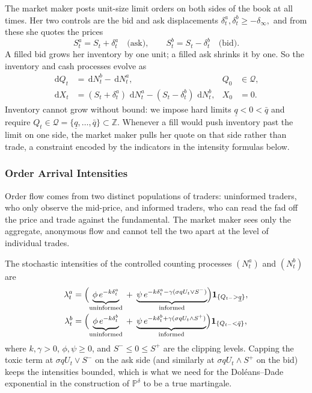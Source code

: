 \documentclass[11pt,a4paper]{article}
\theoremstyle{plain}
\theoremstyle{definition}
\newcommand{\Prob}{\mathbb{P}}
\newcommand{\dd}{\,\mathrm{d}}
\begin{document}
The market maker posts unit-size limit orders on both sides of the book at
all times. Her two controls are the bid and ask displacements
\(\delta^a_t,\delta^b_t \ge -\delta_\infty,\) and from these she quotes
the prices
\begin{equation}
\label{eq:quotes}
  S^a_t = S_t + \delta^a_t \quad\text{(ask)}, \qquad
  S^b_t = S_t - \delta^b_t \quad\text{(bid)}.
\end{equation}
A filled bid grows her inventory by one unit; a filled ask shrinks it by
one. So the inventory and cash processes evolve as
\begin{align}
  \dd Q_t &= \dd N^b_t - \dd N^a_t, & Q_0&\in\mathcal{Q},
  \label{eq:dQ}\\
  \dd X_t &= (S_t+\delta^a_t)\,\dd N^a_t - (S_t-\delta^b_t)\,\dd N^b_t,
  & X_0&=0.
  \label{eq:dX}
\end{align}
Inventory cannot grow without bound: we impose hard limits
$\underline{q}<0<\bar{q}$ and require
$Q_t \in \mathcal{Q}=\{\underline{q},\ldots,\bar{q}\}\subset\mathbb{Z}$.
Whenever a fill would push inventory past the limit on one side, the market
maker pulls her quote on that side rather than trade, a constraint encoded
by the indicators in the intensity formulas below.

\subsubsection{Order Arrival Intensities}

Order flow comes from two distinct populations of traders:
uninformed traders, who only observe the mid-price, and
informed traders, who can read the fad off the price and trade
against the fundamental. The market maker sees only the aggregate,
anonymous flow and cannot tell the two apart at the level of individual
trades.

The stochastic intensities of the controlled counting processes $(N^a_t)$
and $(N^b_t)$ are
\begin{align}
  \lambda^a_t &= \Bigl(\underbrace{\phi\, e^{-k\delta^a_t}}_{\text{uninformed}}
    \;+\; \underbrace{\psi\, e^{-k\delta^a_t - \gamma(\sigma q U_t \vee S^-)}}_{\text{informed}}\Bigr)
    \mathbf{1}_{\{Q_{t-} > \underline{q}\}},
  \label{eq:lambda-a}\\
  \lambda^b_t &= \Bigl(\underbrace{\phi\, e^{-k\delta^b_t}}_{\text{uninformed}}
    \;+\; \underbrace{\psi\, e^{-k\delta^b_t + \gamma(\sigma q U_t \wedge S^+)}}_{\text{informed}}\Bigr)
    \mathbf{1}_{\{Q_{t-} < \bar{q}\}},
  \label{eq:lambda-b}
\end{align}
where $k,\gamma>0$, $\phi,\psi\ge 0$, and $S^-\le 0\le S^+$ are the
clipping levels. Capping the toxic term at $\sigma q U_t \vee S^-$ on the
ask side (and similarly at $\sigma q U_t \wedge S^+$ on the bid) keeps the
intensities bounded, which is what we need for the Doléans--Dade exponential
in the construction of $\Prob^{\delta}$ to be a true martingale.
\end{document}
